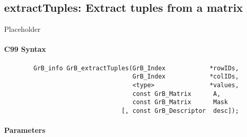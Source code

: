 
\subsection{{\sf extractTuples}: Extract tuples from a matrix}
\label{Sec:extractTuples}

Placeholder


\paragraph{C99 Syntax}

\begin{verbatim}
        GrB_info GrB_extractTuples(GrB_Index            *rowIDs,
                                   GrB_Index            *colIDs,
                                   <type>               *values, 
                                   const GrB_Matrix      A,
                                   const GrB_Matrix      Mask
                                [, const GrB_Descriptor  desc]);
\end{verbatim}

\paragraph{Parameters}

